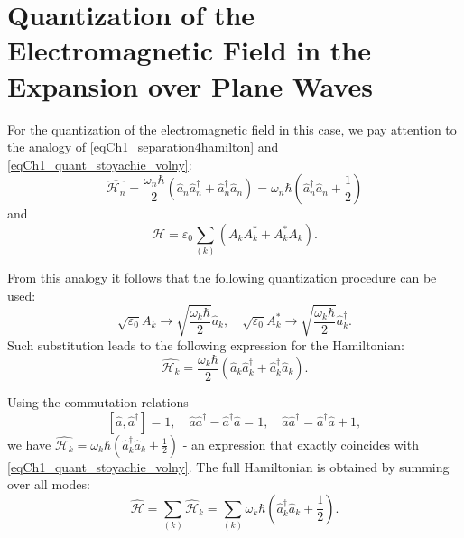 \section{Quantization of the Electromagnetic Field in the Expansion over
  Plane Waves}
For the quantization of the electromagnetic field in this case, we pay attention
to the analogy of \eqref{eqCh1_separation4hamilton} and
\eqref{eqCh1_quant_stoyachie_volny}:
\[
\hat{\mathcal{H}_n} = 
\frac{\omega_n \hbar}{2}
\left(\hat{a}_n \hat{a}_n^{\dag} + \hat{a}_n^{\dag} \hat{a}_n\right)
=
\omega_n \hbar 
\left(\hat{a}_n^{\dag} \hat{a}_n + \frac{1}{2}\right)
\]
and
\[
\mathcal{H} = \varepsilon_0 \sum_{(k)} 
\left(A_k A_k^{*} + A_k^{*} A_k \right).
\]

From this analogy it follows that the following quantization procedure can be used:
\[
\sqrt{\varepsilon_0}A_k \rightarrow \sqrt{\frac{\omega_k \hbar}{2}}
\hat{a}_k, \quad
\sqrt{\varepsilon_0}A_k^{*} \rightarrow \sqrt{\frac{\omega_k \hbar}{2}}
\hat{a}_k^{\dag}.
\]
Such substitution leads to the following expression for the Hamiltonian:
\[
\hat{\mathcal{H}_k} = \frac{\omega_k \hbar}{2} 
\left(\hat{a}_k \hat{a}_k^{\dag} + \hat{a}_k^{\dag} \hat{a}_k\right).
\]

Using the commutation relations
\[
\left[\hat{a}, \hat{a}^{\dag} \right] = 1, \quad
\hat{a} \hat{a}^{\dag} - \hat{a}^{\dag}\hat{a} = 1, \quad
\hat{a} \hat{a}^{\dag} = \hat{a}^{\dag}\hat{a} + 1,
\]
we have
\(
\hat{\mathcal{H}_k} = \omega_k \hbar 
\left(\hat{a}_k^{\dag} \hat{a}_k + \frac{1}{2}\right)
\) - 
an expression that exactly coincides with \eqref{eqCh1_quant_stoyachie_volny}.
The full Hamiltonian is obtained by summing over all modes:
\begin{equation}
\hat{\mathcal{H}} = \sum_{(k)} \hat{\mathcal{H}}_k = \sum_{(k)} 
\omega_k \hbar \left(\hat{a}_k^{\dag} \hat{a}_k + \frac{1}{2}\right).
\end{equation}

